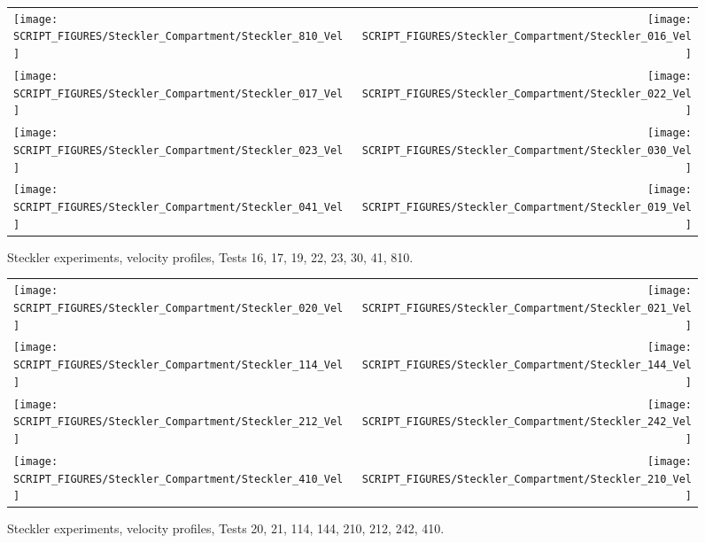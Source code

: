 \begin{figure}[p]
\begin{tabular*}{\textwidth}{l@{\extracolsep{\fill}}r}
\texttt{[image: SCRIPT\_FIGURES/Steckler\_Compartment/Steckler\_810\_Vel]} &
\texttt{[image: SCRIPT\_FIGURES/Steckler\_Compartment/Steckler\_016\_Vel]} \\
\texttt{[image: SCRIPT\_FIGURES/Steckler\_Compartment/Steckler\_017\_Vel]} &
\texttt{[image: SCRIPT\_FIGURES/Steckler\_Compartment/Steckler\_022\_Vel]} \\
\texttt{[image: SCRIPT\_FIGURES/Steckler\_Compartment/Steckler\_023\_Vel]} &
\texttt{[image: SCRIPT\_FIGURES/Steckler\_Compartment/Steckler\_030\_Vel]} \\
\texttt{[image: SCRIPT\_FIGURES/Steckler\_Compartment/Steckler\_041\_Vel]} &
\texttt{[image: SCRIPT\_FIGURES/Steckler\_Compartment/Steckler\_019\_Vel]}
\end{tabular*}
\caption[Steckler experiments, velocity profiles, Tests 16, 17, 19, 22, 23, 30, 41, 810]{Steckler experiments, velocity profiles, Tests 16, 17, 19, 22, 23, 30, 41, 810.}
\label{Steckler_Vel_2}
\end{figure}

\begin{figure}[p]
\begin{tabular*}{\textwidth}{l@{\extracolsep{\fill}}r}
\texttt{[image: SCRIPT\_FIGURES/Steckler\_Compartment/Steckler\_020\_Vel]} &
\texttt{[image: SCRIPT\_FIGURES/Steckler\_Compartment/Steckler\_021\_Vel]} \\
\texttt{[image: SCRIPT\_FIGURES/Steckler\_Compartment/Steckler\_114\_Vel]} &
\texttt{[image: SCRIPT\_FIGURES/Steckler\_Compartment/Steckler\_144\_Vel]} \\
\texttt{[image: SCRIPT\_FIGURES/Steckler\_Compartment/Steckler\_212\_Vel]} &
\texttt{[image: SCRIPT\_FIGURES/Steckler\_Compartment/Steckler\_242\_Vel]} \\
\texttt{[image: SCRIPT\_FIGURES/Steckler\_Compartment/Steckler\_410\_Vel]} &
\texttt{[image: SCRIPT\_FIGURES/Steckler\_Compartment/Steckler\_210\_Vel]}
\end{tabular*}
\caption[Steckler experiments, velocity profiles, Tests 20, 21, 114, 144, 210, 212, 242, 410]{Steckler experiments, velocity profiles, Tests 20, 21, 114, 144, 210, 212, 242, 410.}
\label{Steckler_Vel_3}
\end{figure}

